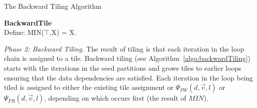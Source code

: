 \begin{algorithm}[t]
\caption{The Backward Tiling Algorithm}
\label{algo:backwardTiling}
\textbf{BackwardTile}\\
  \KwOut{$\theta$}%
Define: MIN($\top$,X) = X.\\
\ForEach{$\vec{i} \in L_{l}$}{
// all datasets \\
\ForEach{$d \in D$}{
// all data elements read by this iteration \\
 \ForEach{$\vec{v} \in R_{L_l\rightarrow D_d}(\vec{i})$}{
 // each later loop's access tables\\
	\ForEach{$L_{k}\in\{L_{l+1}~to~L_{s}\}$}{ 
	// anti dependence\\
	$\theta(l, \vec{i}) = MIN( \theta(l,\vec{i}), \Psi_{FW}(d,\vec{v},k)$) \\
}
}
// all data elements written by this iteration \\
 \ForEach{$\vec{v} \in W_{L_l\rightarrow D_d}(\vec{i})$}{
	\ForEach{$L_{k}\in\{L_{l+1}~to~L_{s}\}$}{ 
	// output dependence\\
	$\theta(l, \vec{i}) = MIN( \theta(l,\vec{i}), \Psi_{FW}(d,\vec{v},k)$) \\
	// flow dependence\\
	$\theta(l, \vec{i}) = MIN( \theta(l,\vec{i}), \Psi_{FR}(d,\vec{v},k)$) \\
}
}
} %
} %

\end{algorithm}


\emph{Phase 2: Backward Tiling.}
The result of tiling is that each iteration in the loop chain is assigned to a tile. %
Backward tiling (see Algorithm~\ref{algo:backwardTiling}) starts with the iterations in
the seed partitions and grows tiles to earlier loops ensuring that the data dependencies are
satisfied.
Each iteration in the loop being tiled is assigned to either the existing tile assignment 
or $\Psi_{FW}(d,\vec{v},l)$ or $\Psi_{FR}(d,\vec{v},l)$, depending on which occurs first (the result of $MIN$).

